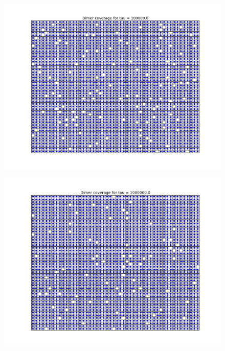 \documentclass[a4paper,12pt]{article}
\begin{document}
\begin{figure}[H]
\centering
\includegraphics[width = \linewidth]{lab11q3_1e5.png}
\caption{}
\label{fig:q3_5}
\end{figure}

\begin{figure}[H]
\centering
\includegraphics[width = \linewidth]{lab11q3_1e6.png}
\caption{}
\label{fig:q3_6}
\end{figure}
\end{document}
